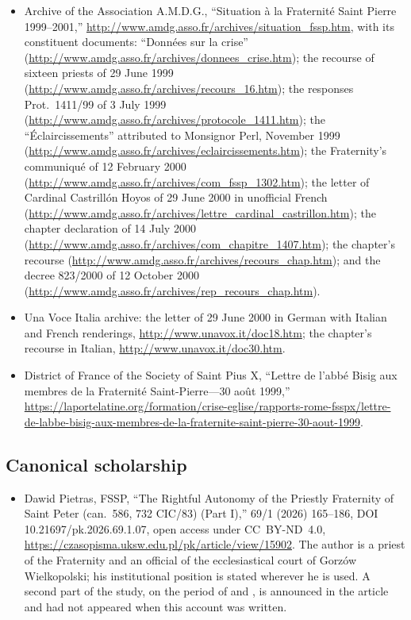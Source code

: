 \begin{itemize}
\item Archive of the Association A.M.D.G., ``Situation à la Fraternité
Saint Pierre 1999--2001,''
\url{http://www.amdg.asso.fr/archives/situation_fssp.htm}, with its
constituent documents: ``Données sur la crise''
(\url{http://www.amdg.asso.fr/archives/donnees_crise.htm}); the recourse
of sixteen priests of 29 June 1999
(\url{http://www.amdg.asso.fr/archives/recours_16.htm}); the responses
Prot.\ 1411/99 of 3 July 1999
(\url{http://www.amdg.asso.fr/archives/protocole_1411.htm}); the
``Éclaircissements'' attributed to Monsignor Perl, November 1999
(\url{http://www.amdg.asso.fr/archives/eclaircissements.htm}); the
Fraternity's communiqué of 12 February 2000
(\url{http://www.amdg.asso.fr/archives/com_fssp_1302.htm}); the letter of
Cardinal Castrillón Hoyos of 29 June 2000 in unofficial French
(\url{http://www.amdg.asso.fr/archives/lettre_cardinal_castrillon.htm});
the chapter declaration of 14 July 2000
(\url{http://www.amdg.asso.fr/archives/com_chapitre_1407.htm}); the
chapter's recourse
(\url{http://www.amdg.asso.fr/archives/recours_chap.htm}); and the decree
823/2000 of 12 October 2000
(\url{http://www.amdg.asso.fr/archives/rep_recours_chap.htm}).
\item Una Voce Italia archive: the letter of 29 June 2000 in German with
Italian and French renderings, \url{http://www.unavox.it/doc18.htm}; the
chapter's recourse in Italian, \url{http://www.unavox.it/doc30.htm}.
\item District of France of the Society of Saint Pius X, ``Lettre de
l'abbé Bisig aux membres de la Fraternité Saint-Pierre---30 août 1999,''
\url{https://laportelatine.org/formation/crise-eglise/rapports-rome-fsspx/lettre-de-labbe-bisig-aux-membres-de-la-fraternite-saint-pierre-30-aout-1999}.
\end{itemize}

\subsection*{Canonical scholarship}

\begin{itemize}
\item Dawid Pietras, FSSP, ``The Rightful Autonomy of the Priestly
Fraternity of Saint Peter (can.~586, 732 CIC/83) (Part I),''  69/1 (2026) 165--186, DOI 10.21697/pk.2026.69.1.07, open
access under CC~BY-ND~4.0,
\url{https://czasopisma.uksw.edu.pl/pk/article/view/15902}. The author is
a priest of the Fraternity and an official of the ecclesiastical court of
Gorzów Wielkopolski; his institutional position is stated wherever he is
used. A second part of the study, on the period of  and , is announced in the article
and had not appeared when this account was written.
\end{itemize}


